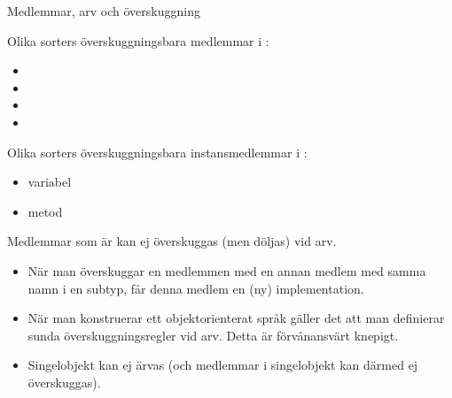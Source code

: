 





\begin{Slide}{Medlemmar, arv och överskuggning}\SlideFontTiny
\begin{multicols}{2}
\noindent Olika sorters överskuggningsbara medlemmar i :
\begin{itemize}
\item {}
\item {}
\item {}
\item {}
\end{itemize}


\columnbreak

\pause

\noindent Olika sorters överskuggningsbara instansmedlemmar i :
\begin{itemize}
\item variabel
\item metod
\end{itemize}

{\SlideFontTiny\noindent Medlemmar som är  kan ej överskuggas (men döljas) vid arv.}

\vspace{0.5em}
\end{multicols}

\pause
\begin{itemize}\SlideFontTiny
\item När man överskuggar  en medlemmen med en annan medlem med samma namn i en subtyp, får denna medlem en (ny) implementation.

\item När man konstruerar ett objektorienterat språk gäller det att man definierar sunda överskuggningsregler vid arv. Detta är förvånansvärt knepigt.

\item Singelobjekt kan ej ärvas (och medlemmar i singelobjekt kan därmed ej överskuggas).
\end{itemize}
\end{Slide}


